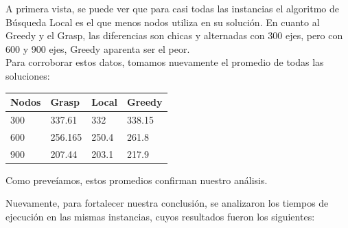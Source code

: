 A primera vista, se puede ver que para casi todas las instancias el algoritmo de B\'usqueda Local es el que menos nodos utiliza en su soluci\'on. 
En cuanto al Greedy y el Grasp, las diferencias son chicas y alternadas con 300 ejes, pero con 600 y 900 ejes, Greedy aparenta ser el peor.\\

Para corroborar estos datos, tomamos nuevamente el promedio de todas las soluciones:\\

\begin{tabular}{| l | l | l | l |}
   \hline
   Nodos & Grasp & Local & Greedy\\ \hline
   300 & 337.61 & 332 & 338.15 \\ \hline
   600 & 256.165 & 250.4 & 261.8 \\ \hline
   900 & 207.44 & 203.1 & 217.9 \\
   \hline
\end{tabular}

Como preve\'iamos, estos promedios confirman nuestro an\'alisis.

Nuevamente, para fortalecer nuestra conclusión, se analizaron los tiempos de ejecución en las mismas instancias, cuyos resultados fueron los siguientes:

